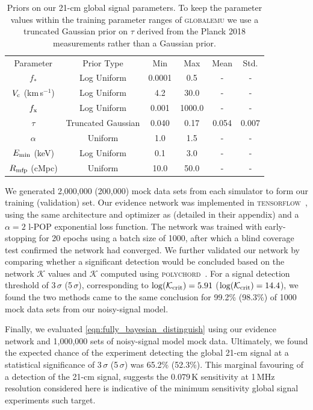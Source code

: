 \documentclass[twocolumn,english,aps,prl,amsmath,amssymb,reprint,footinbib,floatfix,showkeys]{revtex4-2}
\newcommand{\br}{\mathcal{K}}
\begin{document}
\begin{table}
 \caption{Priors on our 21-cm global signal parameters. To keep the parameter values within the training parameter ranges of \textsc{globalemu} we use a truncated Gaussian prior on $\tau$ derived from the Planck 2018 measurements rather than a Gaussian prior.}
 \label{tab:priors}
 \begin{ruledtabular}
 \begin{tabular}{cccccc}
  Parameter & Prior Type & Min & Max & Mean & Std. \\
\colrule
  $f_{*}$ & Log Uniform & 0.0001 & 0.5 & - & - \\
  $V_{\rm c}$ (km\,s$^{-1}$) & Log Uniform & 4.2 & 30.0 & - & - \\
  $f_{\rm x}$ & Log Uniform & 0.001 & 1000.0 & - & - \\
  $\tau$ & Truncated Gaussian & 0.040 & 0.17 & 0.054 & 0.007 \\
  $\alpha$ & Uniform & 1.0 & 1.5 & - & - \\
  $E_{\rm min}$ (keV) & Log Uniform & 0.1 & 3.0 & - & - \\
  $R_{\rm mfp}$ (cMpc) & Uniform & 10.0 & 50.0 & - & - \\
 \end{tabular}
 \end{ruledtabular}
\end{table}


We generated 2,000,000 (200,000) mock data sets from each simulator to form our training (validation) set.  
Our evidence network was implemented in \textsc{tensorflow}~\citep{tensorflow}, using the same architecture and optimizer as \citet{EN} (detailed in their appendix) and a $\alpha = 2$ l-POP exponential loss function.
The network was trained with early-stopping for 20 epochs using a batch size of 1000, after which a blind coverage test confirmed the network had converged.
We further validated our network by comparing whether a significant detection would be concluded based on the network $\br$ values and $\br$ computed using \textsc{polychord}~\citep{POLYCHORD_I, POLYCHORD_II}. 
For a signal detection threshold of 3\,$\sigma$ (5\,$\sigma$), corresponding to $\log(\br_{\rm crit}) = 5.91$ ($\log(\br_{\rm crit}) = 14.4$), we found the two methods came to the same conclusion for 99.2\% (98.3\%) of 1000 mock data sets from our noisy-signal model. 



Finally, we evaluated \cref{eqn:fully_bayesian_distinguish} using our evidence network and 1,000,000 sets of noisy-signal model mock data.
Ultimately, we found the expected chance of the experiment detecting the global 21-cm signal at a statistical significance of 3\,$\sigma$ (5\,$\sigma$) was 65.2\% (52.3\%).
This marginal favouring of a detection of the 21-cm signal, suggests the $0.079$\,K sensitivity at 1\,MHz resolution considered here is indicative of the minimum sensitivity global signal experiments such target.
\end{document}
